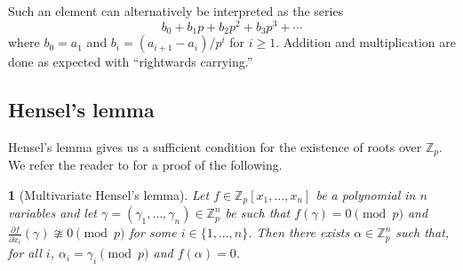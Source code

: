 \documentclass[10pt,a4paper]{amsart}
\numberwithin{equation}{section}
\numberwithin{figure}{section}
\theoremstyle{definition}
\theoremstyle{remark}
\theoremstyle{plain}
\newtheorem{thm}{\protect\theoremname}[section]
\theoremstyle{plain}
\theoremstyle{definition}
\newtheorem{defn}{\protect\definitionname}[section]
\theoremstyle{plain}
\theoremstyle{plain}
\providecommand{\definitionname}{Definition}
\providecommand{\theoremname}{Theorem}
\newcommand{\Z}{\mathbb{Z}}
\newcommand{\Q}{\mathbb{Q}}
\begin{document}
	Such an element can alternatively be interpreted as the series
	\[
	b_0 + b_1 p + b_2 p^2 + b_3 p^3 + \cdots
	\]
	where $b_0 = a_1$ and $b_i = (a_{i+1} - a_i)/p^i$ for $i \geq 1$. Addition and multiplication are done as expected with ``rightwards carrying.''
	
	\subsection{Hensel's lemma}
	Hensel's lemma gives us a sufficient condition for the existence of roots over $\Z_p$. We refer the reader to \cite{henselMO} for a proof of the following.
	\begin{thm}[Multivariate Hensel's lemma]\label{thm:hensels-one-eq}
		Let $f \in \Z_p[x_1,\ldots,x_n]$ be a polynomial in $n$ variables and let $\gamma = (\gamma_1,\ldots,\gamma_n)\in \Z_p^n$ be such that $f(\gamma) = 0 \pmod p$ and $\frac{\partial f}{\partial x_i}(\gamma) \ncong 0 \pmod p$ for some $i\in \{1,\ldots,n\}$. Then there exists $\alpha \in \Z_p^n$ such that, for all $i$, $\alpha_i = \gamma_i \pmod p$ and $f(\alpha) = 0$.
	\end{thm}
\end{document}
